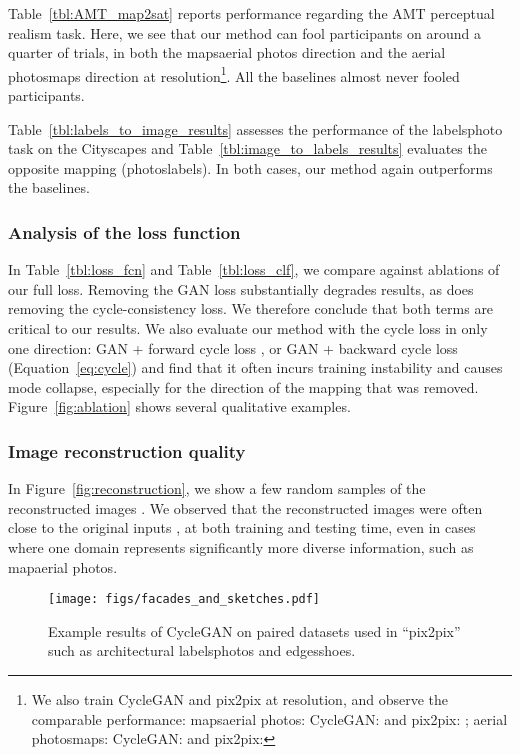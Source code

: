 \documentclass[10pt,twocolumn,letterpaper]{article}
\newcommand{\reffig}[1]{Figure~\ref{fig:#1}}
\newcommand{\reftbl}[1]{Table~\ref{tbl:#1}}
\newcommand{\refeq}[1]{Equation~\ref{eq:#1}}
\newcommand{\lblfig}[1]{\label{fig:#1}}
\newcommand{\lblsec}[1]{\label{sec:#1}}
\begin{document}
\reftbl{AMT_map2sat} reports performance regarding the AMT perceptual realism task. Here, we see that our method can fool participants on around a quarter of trials, in both the mapsaerial photos direction and the aerial photosmaps direction at  resolution\footnote{We also train CycleGAN and pix2pix at  resolution, and observe the comparable performance:  mapsaerial photos: CycleGAN:  and pix2pix: ; aerial photosmaps: CycleGAN:  and pix2pix: }. All the baselines almost never fooled participants.

\reftbl{labels_to_image_results} assesses the performance of the labelsphoto task on the Cityscapes and \reftbl{image_to_labels_results} evaluates the opposite mapping (photoslabels). In both cases, our method again outperforms the baselines.

\vspace{-1 mm}
\subsubsection{Analysis of the loss function}
\lblsec{ablation}
\vspace{-1 mm}


In \reftbl{loss_fcn} and \reftbl{loss_clf}, we compare against ablations of our full loss. Removing the GAN loss substantially degrades results, as does removing the cycle-consistency loss. We therefore conclude that both terms are critical to our results. We also evaluate our method with the cycle loss in only one direction: GAN + forward cycle loss , or GAN + backward cycle loss  (\refeq{cycle}) and find that it often incurs training instability and causes mode collapse, especially for the direction of the mapping that was removed. \reffig{ablation} shows several qualitative examples. 

\vspace{-1 mm}
\subsubsection{Image reconstruction quality}
\vspace{-1 mm}

In \reffig{reconstruction}, we show a few random samples of the reconstructed images . We observed that the reconstructed images were often close to the original inputs , at both training and testing time, even in cases where one domain represents significantly more diverse information, such as mapaerial photos. 


\begin{figure}[t]
\begin{center}
\texttt{[image: figs/facades\_and\_sketches.pdf]}
\end{center}
 \vspace{-5 mm}
 \caption{Example results of CycleGAN on paired datasets used in ``pix2pix''~\cite{isola2016image} such as architectural labelsphotos and edgesshoes.}
\lblfig{facades_and_sketches}
 \vspace{-5 mm}
\end{figure}
\end{document}
